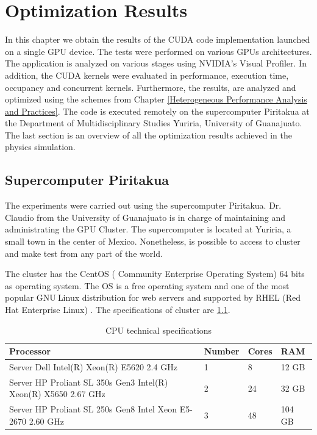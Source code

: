 
\chapter{Optimization Results} %

\label{Optimization Results} %



In this chapter we obtain the results of the CUDA code implementation launched on a single GPU device. The tests were performed on various GPUs architectures. The application is analyzed on various stages using NVIDIA's Visual Profiler. In addition, the CUDA kernels were evaluated in performance, execution time, occupancy and concurrent kernels. Furthermore, the results, are analyzed and optimized using the schemes from Chapter \ref{Heterogeneous Performance Analysis and Practices}. The code is executed remotely on the supercomputer Piritakua at the Department of Multidisciplinary Studies Yuriria, University of Guanajuato. The last section is an overview of all the optimization results achieved in the physics simulation.

\section{Supercomputer Piritakua}

The experiments were carried out using the supercomputer Piritakua. Dr. Claudio from the University of Guanajuato is in charge of maintaining and administrating the GPU Cluster. The supercomputer is located at Yuriria, a small town in the center of Mexico. Nonetheless, is possible to access to cluster and make test from any part of the world.

The cluster has the CentOS ( Community Enterprise Operating System) 64 bits as operating system. The OS is a free operating system and one of the most popular GNU$ \ $Linux distribution for web servers and supported by RHEL (Red Hat Enterprise Linux) \cite{centos}. The specifications of cluster are \ref{tab:cpus}.

\begin{table}[h]
\centering
\begin{tabular}{ | p{7.1cm}  | l | l | l |}
  \hline
  Processor & Number & Cores & RAM  \\
  \hline
  Server Dell Intel(R) Xeon(R) E5620 2.4 GHz & 1 & 8 & 12 GB \\
  \hline
  Server HP Proliant SL 350s Gen3 Intel(R) Xeon(R) X5650 2.67 GHz & 2 & 24 & 32 GB \\
  \hline
   Server HP Proliant SL 250s Gen8 Intel Xeon E5-2670 2.60 GHz & 3 & 48 & 104 GB \\
   \hline
  \end{tabular}
      \caption{CPU technical specifications}
  \label{tab:cpus}
  \end{table}

